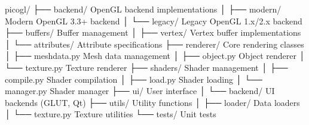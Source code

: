 \documentclass[a4paper,10pt,english,openany,oneside]{sphinxmanual}
\begin{document}
\begin{sphinxVerbatim}[commandchars=\\\{\}]
picogl/
├── backend/           \PYGZsh{} OpenGL backend implementations
│   ├── modern/        \PYGZsh{} Modern OpenGL 3.3+ backend
│   └── legacy/        \PYGZsh{} Legacy OpenGL 1.x/2.x backend
├── buffers/           \PYGZsh{} Buffer management
│   ├── vertex/        \PYGZsh{} Vertex buffer implementations
│   └── attributes/    \PYGZsh{} Attribute specifications
├── renderer/          \PYGZsh{} Core rendering classes
│   ├── meshdata.py    \PYGZsh{} Mesh data management
│   ├── object.py      \PYGZsh{} Object renderer
│   └── texture.py     \PYGZsh{} Texture renderer
├── shaders/           \PYGZsh{} Shader management
│   ├── compile.py     \PYGZsh{} Shader compilation
│   ├── load.py        \PYGZsh{} Shader loading
│   └── manager.py     \PYGZsh{} Shader manager
├── ui/                \PYGZsh{} User interface
│   └── backend/       \PYGZsh{} UI backends (GLUT, Qt)
├── utils/             \PYGZsh{} Utility functions
│   ├── loader/        \PYGZsh{} Data loaders
│   └── texture.py     \PYGZsh{} Texture utilities
└── tests/             \PYGZsh{} Unit tests
\end{sphinxVerbatim}
\end{document}
